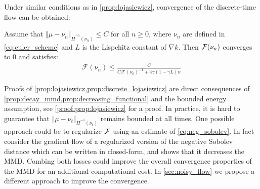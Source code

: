 Under similar conditions as in \cref{prop:lojasiewicz}, convergence of the discrete-time flow can be obtained:
\begin{proposition}\label{prop:discrete_lojasiewicz}
	Assume that $\Vert \mu - \nu_n \Vert_{\dot{H}^{-1}(\nu_n)} \leq C$ for all $n\geq 0$, where $\nu_n$ are defined in \cref{eq:euler_scheme} and $L$ is the Lispchitz constant of $\nabla k$. Then ${{\mathcal F}}(\nu_n)$ converges to $0$ and satisfies:
	\begin{align}
	\mathcal{F}(\nu_n)\leq \frac{C}{C\mathcal{F}(\nu_0)^{-1} + 4 \gamma(1-\gamma L) n}
	\end{align}
\end{proposition}
Proofs of \cref{prop:lojasiewicz,prop:discrete_lojasiewicz} are direct consequences of \cref{prop:decay_mmd,prop:decreasing_functional} and the bounded energy assumption, see  \cref{proof:prop:lojasiewicz} for a proof.
In practice, it is hard to guarantee that $\Vert \mu - \nu_t \Vert_{\dot{H}^{-1}(\nu_t)} $ remains bounded at all times. One possible approach could be to regularize ${{\mathcal F}}$ using an estimate of \cref{eq:neg_sobolev}. In fact \cite{Mroueh:2019} consider the gradient flow of a regularized version of the negative Sobolev distance which can be written in closed-form, and shows that it decreases the MMD. Combing both losses could improve the overall convergence properties of the MMD for an additional computational cost. In \cref{sec:noisy_flow} we propose a different approach to improve the convergence.%


 








